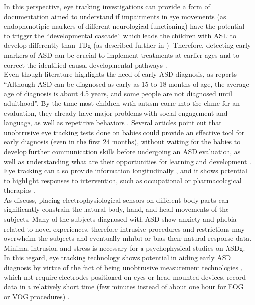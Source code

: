 In this perspective, eye tracking investigations can provide a form of documentation aimed to understand if impairments in eye movements (as endophenotipic markers of different neurological functioning) have the potential to trigger the “developmental cascade” \citep{towie2016screening}  which leads the children with ASD to develop differently than TDg (as described further in ). Therefore, detecting early markers of ASD can be crucial to implement treatments at earlier ages and to correct the identified causal developmental pathways \citep{young2009gazechildren}.\\
Even though literature highlights the need of early ASD diagnosis, as \cite{apa2017diagnosis} reports “Although ASD can be diagnosed as early as 15 to 18 months of age, the average age of diagnosis is about 4.5 years, and some people are not diagnosed until adulthood”. By the time most children with autism come into the clinic for an evaluation, they already have major problems with social engagement and language, as well as repetitive behaviors \citep{bourzac2012development}.
Several articles \citep{boraston2007eyetrackingASD,jones2008preferencesocial,zwaigenbaum2005behaviorchildren} point out that unobtrusive eye tracking tests done on babies could provide an effective tool for early diagnosis (even in the first 24 months), without waiting for the babies to develop further communication skills before undergoing an ASD evaluation, as well as understanding what are their opportunities for learning and development \citep{falck-ytter2013eyetrackingASD}.
Eye tracking can also provide information longitudinally \citep{zwaigenbaum2005behaviorchildren}, and it shows potential to highlight responses to intervention, such as occupational  or pharmacological therapies \citep{johnson2016review}.\\
As \cite{samad2017markers} discuss, placing electrophysiological sensors on different body parts can significantly constrain the natural body, hand, and head movements of the subjects. Many of the subjects diagnosed with ASD show anxiety and phobia related to novel experiences, therefore intrusive procedures and restrictions may overwhelm the subjects and eventually inhibit or bias their natural response data. Minimal intrusion and stress is necessary for a psychophysical studies on ASDg. In this regard, eye tracking technology shows potential in aiding early ASD diagnosis by virtue of the fact of being unobtrusive measurement technologies \citep{bolte2016detection,falck-ytter2013eyetrackingASD}, which not require electrodes positioned on eyes or head-mounted devices, record data in a relatively short time (few minutes instead of about one hour for EOG or VOG procedures) \citep{giordano2017eyetrackersystem}.\\
